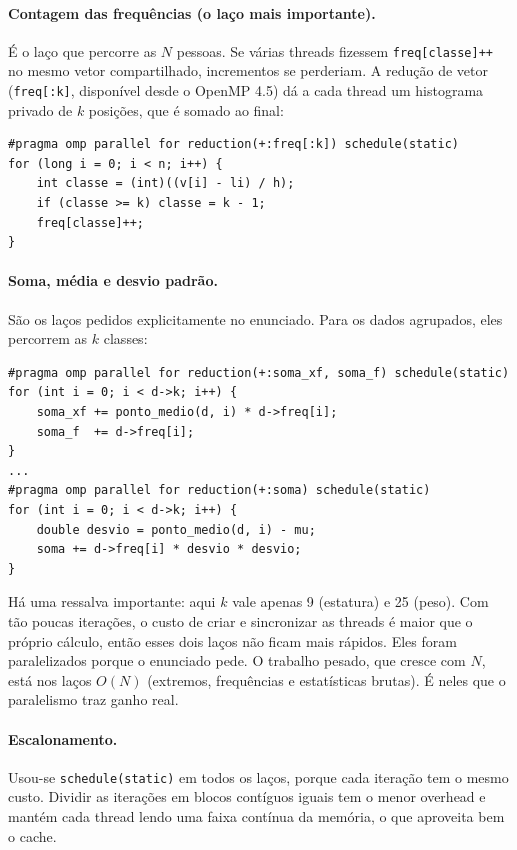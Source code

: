 \documentclass[11pt,a4paper]{article}
\begin{document}
\paragraph{Contagem das frequências (o laço mais importante).}
É o laço que percorre as $N$ pessoas. Se várias threads fizessem \texttt{freq[classe]++} no mesmo vetor
compartilhado, incrementos se perderiam. A redução de vetor (\texttt{freq[:k]}, disponível desde o OpenMP 4.5)
dá a cada thread um histograma privado de $k$ posições, que é somado ao final:
\begin{lstlisting}
#pragma omp parallel for reduction(+:freq[:k]) schedule(static)
for (long i = 0; i < n; i++) {
    int classe = (int)((v[i] - li) / h);
    if (classe >= k) classe = k - 1;
    freq[classe]++;
}
\end{lstlisting}

\paragraph{Soma, média e desvio padrão.}
São os laços pedidos explicitamente no enunciado. Para os dados agrupados, eles percorrem as $k$ classes:
\begin{lstlisting}
#pragma omp parallel for reduction(+:soma_xf, soma_f) schedule(static)
for (int i = 0; i < d->k; i++) {
    soma_xf += ponto_medio(d, i) * d->freq[i];
    soma_f  += d->freq[i];
}
...
#pragma omp parallel for reduction(+:soma) schedule(static)
for (int i = 0; i < d->k; i++) {
    double desvio = ponto_medio(d, i) - mu;
    soma += d->freq[i] * desvio * desvio;
}
\end{lstlisting}
Há uma ressalva importante: aqui $k$ vale apenas 9 (estatura) e 25 (peso). Com tão poucas iterações, o
custo de criar e sincronizar as threads é maior que o próprio cálculo, então esses dois laços não ficam
mais rápidos. Eles foram paralelizados porque o enunciado pede. O trabalho pesado, que cresce com $N$, está nos
laços $O(N)$ (extremos, frequências e estatísticas brutas). É neles que o paralelismo traz ganho real.

\paragraph{Escalonamento.} Usou-se \texttt{schedule(static)} em todos os laços, porque cada iteração tem o mesmo
custo. Dividir as iterações em blocos contíguos iguais tem o menor overhead e mantém cada thread lendo uma faixa
contínua da memória, o que aproveita bem o cache.
\end{document}
